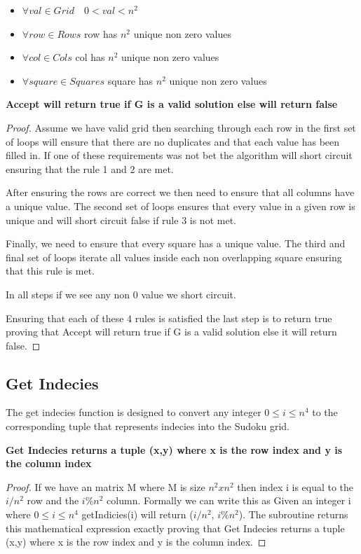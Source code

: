 \documentclass{sig-alternate}
\begin{document}
\begin{itemize}
\item{$\forall val \in Grid \quad 0 < val < n^2$} 
\item{$\forall row \in Rows$ row has $n^2$ unique non zero values}
\item{$\forall col \in Cols$ col has $n^2$ unique non zero values}
\item{$\forall square \in Squares$ square has $n^2$ unique non zero values}
\end{itemize}

\textbf{Accept will return true if G is a valid solution else will return false}
\begin{proof}
Assume we have valid grid then searching through each row in the first set of loops will ensure that there are no duplicates and that each value has been filled in. If one of these requirements was not bet the algorithm will short circuit ensuring that the rule 1 and 2 are met. 

After ensuring the rows are correct we then need to ensure that all columns have a unique value. The second set of loops ensures that every value in a given row is unique and will short circuit false if rule 3 is not met. 

Finally, we need to ensure that every square has a unique value. The third and final set of loops iterate all values inside each non overlapping square ensuring that this rule is met. 

In all steps if we see any non 0 value we short circuit. 

Ensuring that each of these 4 rules is satisfied the last step is to return true proving that Accept will return true if G is a valid solution else it will return false. 
\end{proof}

\subsection{Get Indecies}
The get indecies function is designed to convert any integer $0 \le i \le n^4$ to the corresponding tuple that represents indecies into the Sudoku grid.

\textbf{Get Indecies returns a tuple (x,y) where x is the row index and y is the column index}
\begin{proof}
If we have an matrix M where M is size $n^2 x n^2$ then index i is equal to the $i/n^2$ row and the $i\%n^2$ column. Formally we can write this as Given an integer i where $0 \le i \le n^4$ getIndicies(i) will return ($i/n^2$, $i\%n^2$). The subroutine returns this mathematical expression exactly proving that Get Indecies returns a tuple (x,y) where x is the row index and y is the column index.
\end{proof}
\end{document}
